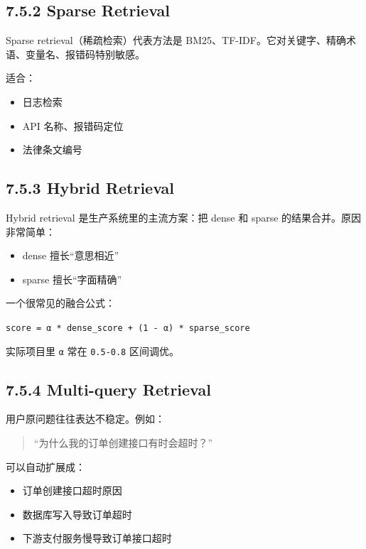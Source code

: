 \subsection{7.5.2 Sparse Retrieval}

Sparse retrieval（稀疏检索）代表方法是 BM25、TF-IDF。它对关键字、精确术语、变量名、报错码特别敏感。


适合：


\begin{itemize}[leftmargin=2em]
\item 日志检索
\item API 名称、报错码定位
\item 法律条文编号
\end{itemize}

\subsection{7.5.3 Hybrid Retrieval}

Hybrid retrieval 是生产系统里的主流方案：把 dense 和 sparse 的结果合并。原因非常简单：


\begin{itemize}[leftmargin=2em]
\item dense 擅长``意思相近''
\item sparse 擅长``字面精确''
\end{itemize}

一个很常见的融合公式：


\texttt{score = α * dense\_score + (1 - α) * sparse\_score}


实际项目里 \texttt{α} 常在 \texttt{0.5-0.8} 区间调优。


\subsection{7.5.4 Multi-query Retrieval}

用户原问题往往表达不稳定。例如：


\begin{quote}
``为什么我的订单创建接口有时会超时？''\\
\end{quote}

可以自动扩展成：


\begin{itemize}[leftmargin=2em]
\item 订单创建接口超时原因
\item 数据库写入导致订单超时
\item 下游支付服务慢导致订单接口超时
\end{itemize}

